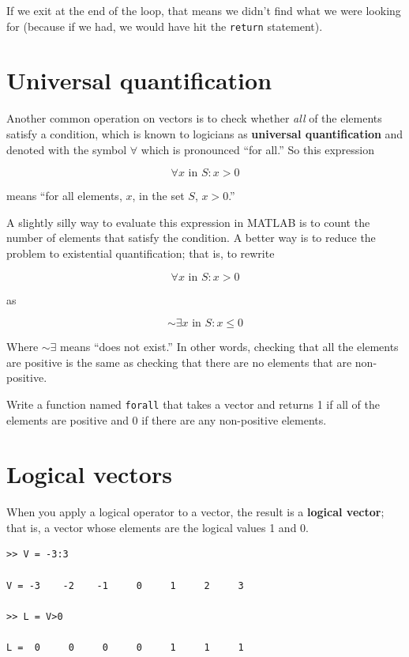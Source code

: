 \documentclass{book}
\begin{document}
If we exit at the end of the loop, that means we didn't find what
we were looking for (because if we had, we would have hit the
{\tt return} statement).



\section{Universal quantification}

Another common operation on vectors is to check whether {\em all}
of the elements satisfy a condition, which is known to
logicians as {\bf universal quantification} and denoted with
the symbol $\forall$ which is pronounced ``for all.''  So this
expression

\[ \forall x \mbox{~in~} S: x>0 \]

means ``for all elements, $x$, in the set $S$, $x>0$.''

A slightly silly way to evaluate this expression in MATLAB is to
count the number of elements that satisfy the condition.
A better way is to reduce the problem to
existential quantification; that is, to rewrite

\[ \forall x \mbox{~in~} S: x>0 \]

as

\[ \sim \exists x \mbox{~in~} S: x \le 0 \]

Where $\sim \exists$ means ``does not exist.''
In other words, checking that all the elements are positive is
the same as checking that there are no elements 
that are non-positive.

\begin{ex}
Write a function named {\tt forall} that
takes a vector and returns 1 if all of the elements are positive
and 0 if there are any non-positive elements.
\end{ex}




\section{Logical vectors}

When you apply a logical operator to a vector, the result is a {\bf
logical vector}; that is, a vector whose elements are the logical
values 1 and 0.

\begin{verbatim}
>> V = -3:3

V = -3    -2    -1     0     1     2     3

>> L = V>0

L =  0     0     0     0     1     1     1
\end{verbatim}
\end{document}
